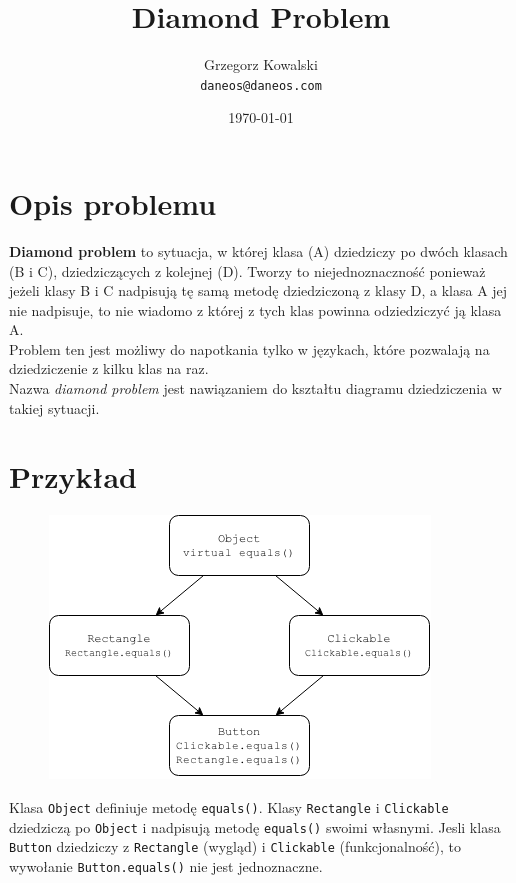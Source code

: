 \documentclass[12pt,a4paper]{article}
\begin{document}
\title{Diamond Problem}
\author{Grzegorz Kowalski\\\texttt{daneos@daneos.com}}
\date{\today}
\maketitle

\section{Opis problemu}
\textbf{Diamond problem} to sytuacja, w której klasa (A) dziedziczy po dwóch klasach (B i C), dziedziczących z kolejnej (D).
Tworzy to niejednoznaczność ponieważ jeżeli klasy B i C nadpisują tę samą metodę dziedziczoną z klasy D, a klasa A jej nie nadpisuje, to nie wiadomo z której z tych klas powinna odziedziczyć ją klasa A.\\
Problem ten jest możliwy do napotkania tylko w językach, które pozwalają na dziedziczenie z kilku klas na raz.\\
Nazwa \emph{diamond problem} jest nawiązaniem do kształtu diagramu dziedziczenia w takiej sytuacji.

\section{Przykład}
\begin{figure}
	\begin{center}
		\includegraphics[scale=0.65]{diamond.png}
	\end{center}
\end{figure}
Klasa \texttt{Object} definiuje metodę \texttt{equals()}. Klasy \texttt{Rectangle} i \texttt{Clickable} dziedziczą po \texttt{Object} i nadpisują metodę \texttt{equals()} swoimi własnymi. Jesli klasa \texttt{Button} dziedziczy z \texttt{Rectangle} (wygląd) i \texttt{Clickable} (funkcjonalność), to wywołanie \texttt{Button.equals()} nie jest jednoznaczne.
\end{document}
